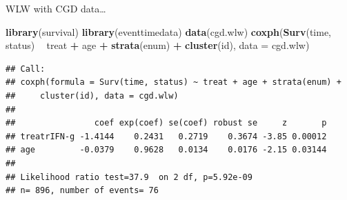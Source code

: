 \documentclass[ignorenonframetext,]{beamer}
\newenvironment{Shaded}{\begin{snugshade}}{\end{snugshade}}
\newcommand{\DataTypeTok}[1]{\textcolor[rgb]{0.13,0.29,0.53}{#1}}
\newcommand{\KeywordTok}[1]{\textcolor[rgb]{0.13,0.29,0.53}{\textbf{#1}}}
\newcommand{\NormalTok}[1]{#1}
\newcommand{\OperatorTok}[1]{\textcolor[rgb]{0.81,0.36,0.00}{\textbf{#1}}}
\newcommand{\StringTok}[1]{\textcolor[rgb]{0.31,0.60,0.02}{#1}}
\begin{document}
\begin{frame}[fragile]{%
\protect\hypertarget{wlw-with-cgd-data-1}{%
WLW with CGD data\ldots}}

\footnotesize

\begin{Shaded}
\begin{Highlighting}[]
\KeywordTok{library}\NormalTok{(survival)}
\KeywordTok{library}\NormalTok{(eventtimedata)}
\KeywordTok{data}\NormalTok{(cgd.wlw)}
\KeywordTok{coxph}\NormalTok{(}\KeywordTok{Surv}\NormalTok{(time, status) }\OperatorTok{~}\StringTok{ }\NormalTok{treat }\OperatorTok{+}\StringTok{ }\NormalTok{age }\OperatorTok{+}\StringTok{ }\KeywordTok{strata}\NormalTok{(enum)}
      \OperatorTok{+}\StringTok{ }\KeywordTok{cluster}\NormalTok{(id), }\DataTypeTok{data =}\NormalTok{ cgd.wlw)}
\end{Highlighting}
\end{Shaded}

\begin{verbatim}
## Call:
## coxph(formula = Surv(time, status) ~ treat + age + strata(enum) + 
##     cluster(id), data = cgd.wlw)
## 
##                coef exp(coef) se(coef) robust se     z       p
## treatrIFN-g -1.4144    0.2431   0.2719    0.3674 -3.85 0.00012
## age         -0.0379    0.9628   0.0134    0.0176 -2.15 0.03144
## 
## Likelihood ratio test=37.9  on 2 df, p=5.92e-09
## n= 896, number of events= 76
\end{verbatim}

\end{frame}
\end{document}
